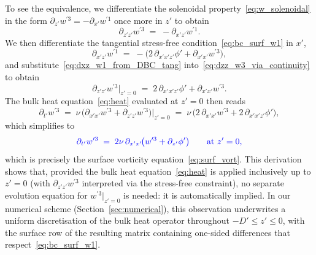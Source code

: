 \documentclass{article}
\begin{document}
To see the equivalence, we differentiate the solenoidal property~\eqref{eq:w_solenoidal} in the form $\partial_{z'} w^{\prime 3} = -\partial_{x'} w^{\prime 1}$ once more in $z'$ to obtain
\begin{equation}
    \partial_{z'z'} w^{\prime 3} \;=\; -\partial_{x'z'} w^{\prime 1}. \label{eq:dzz_w3_via_continuity}
\end{equation}
We then differentiate the tangential stress-free condition~\eqref{eq:bc_surf_w1} in $x'$,
\begin{equation}
    \partial_{x'z'} w^{\prime 1} \;=\; -\big(2\,\partial_{x'x'z'}\phi' + \partial_{x'x'} w^{\prime 3}\big), \label{eq:dxz_w1_from_DBC_tang}
\end{equation}
and substitute~\eqref{eq:dxz_w1_from_DBC_tang} into~\eqref{eq:dzz_w3_via_continuity} to obtain
\begin{equation}
    \partial_{z'z'} w^{\prime 3}\big|_{z'=0} \;=\; 2\,\partial_{x'x'z'}\phi' + \partial_{x'x'} w^{\prime 3}. \label{eq:dzz_w3_at_surface}
\end{equation}
The bulk heat equation~\eqref{eq:heat} evaluated at $z' = 0$ then reads
\begin{equation}
    \partial_{t'} w^{\prime 3} \;=\; \nu\,\big(\partial_{x'x'} w^{\prime 3} + \partial_{z'z'} w^{\prime 3}\big)\big|_{z'=0} \;=\; \nu\,\big(2\,\partial_{x'x'} w^{\prime 3} + 2\,\partial_{x'x'z'}\phi'\big), \label{eq:heat_at_surface_subst}
\end{equation}
which simplifies to
\color{black}
\begin{equation}
\color{blue}
    \partial_{t'} w^{\prime 3} \;=\; 2\nu\,\partial_{x'x'}\!\big(w^{\prime 3} + \partial_{z'}\phi'\big) \qquad \text{at } z' = 0, \label{eq:surf_vort_recovered}
\end{equation}
which is precisely the surface vorticity equation~\eqref{eq:surf_vort}.
This derivation shows that, provided the bulk heat equation~\eqref{eq:heat} is applied inclusively up to $z' = 0$ (with $\partial_{z'z'} w^{\prime 3}$ interpreted via the stress-free constraint), no separate evolution equation for $w^{\prime 3}|_{z'=0}$ is needed: it is automatically implied.
In our numerical scheme (Section~\ref{sec:numerical}), this observation underwrites a uniform discretisation of the bulk heat operator throughout $-D' \le z' \le 0$, with the surface row of the resulting matrix containing one-sided differences that respect~\eqref{eq:bc_surf_w1}.
\end{document}
